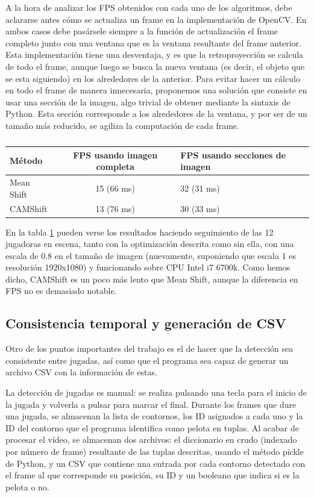 A la hora de analizar los FPS obtenidos con cada uno de los algoritmos, debe aclararse antes cómo se actualiza un frame en la implementación de OpenCV. En ambos casos debe pasársele siempre a la función de actualización el frame completo junto con una ventana que es la ventana resultante del frame anterior. Esta implementación tiene una desventaja, y es que la retroproyección se calcula de todo el frame, aunque luego se busca la nueva ventana (es decir, el objeto que se esta siguiendo) en los alrededores de la anterior. Para evitar hacer un cálculo en todo el frame de manera innecesaria, proponemos una solución que consiste en usar una sección de la imagen, algo trivial de obtener mediante la sintaxis de Python. Esta sección corresponde a los alrededores de la ventana, y por ser de un tamaño más reducido, se agiliza la computación de cada frame.

\begin{table}
  \centering
  \begin{tabular}{|l|c|l|}\hline
  \textbf{Método} & \multicolumn{1}{m{4cm}|}{\textbf{FPS usando imagen completa}}&  \multicolumn{1}{m{4cm}|}{\textbf{FPS usando secciones de imagen}}\\\hline
  Mean Shift & 15 (66 ms) & 32 (31 ms) \\\hline
  CAMShift & 13 (76 ms)& 30 (33 ms)\\\hline
  \end{tabular}
\caption{}
\label{tab:2}
\end{table}

En la tabla \ref{tab:2} pueden verse los resultados haciendo seguimiento de las 12 jugadoras en escena, tanto con la optimización descrita como sin ella, con una escala de 0.8 en el tamaño de imagen (nuevamente, suponiendo que escala 1 es resolución 1920x1080) y funcionando sobre CPU Intel i7 6700k. Como hemos dicho, CAMShift es un poco más lento que Mean Shift, aunque la diferencia en FPS no es demasiado notable.

\subsection{Consistencia temporal y generación de CSV}
Otro de los puntos importantes del trabajo es el de hacer que la detección sea consistente entre jugadas, así como que el programa sea capaz de generar un archivo CSV con la información de estas.

La detección de jugadas es manual: se realiza pulsando una tecla para el inicio de la jugada y volverla a pulsar para marcar el final. Durante los frames que dure una jugada, se almacenan la lista de contornos, los ID asignados a cada uno y la ID del contorno que el programa identifica como pelota en tuplas. Al acabar de procesar el vídeo, se almacenan dos archivos: el diccionario en crudo (indexado por número de frame) resultante de las tuplas descritas, usando el método pickle de Python, y un CSV que contiene una entrada por cada contorno detectado con el frame al que corresponde su posición, su ID y un booleano que indica si es la pelota o no.

